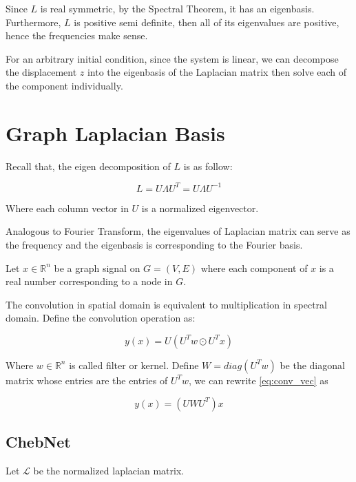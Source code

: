 \documentclass{article}
\begin{document}
    Since $L$ is real symmetric, by the Spectral Theorem, it has an eigenbasis. Furthermore, $L$ is positive semi definite, then all of its eigenvalues are positive, hence the frequencies make sense.

    For an arbitrary initial condition, since the system is linear, we can decompose the displacement $z$ into the eigenbasis of the Laplacian matrix then solve each of the component individually.

    \section{Graph Laplacian Basis}

    Recall that, the eigen decomposition of $L$ is as follow:

    \begin{equation}
        L = U \Lambda U^T = U \Lambda U^{-1}
    \end{equation}

    Where each column vector in $U$ is a normalized eigenvector.

    Analogous to Fourier Transform, the eigenvalues of Laplacian matrix can serve as the frequency and the eigenbasis is corresponding to the Fourier basis.

    Let $x \in \mathbb{R}^n$ be a graph signal on $G = (V, E)$ where each component of $x$ is a real number corresponding to a node in $G$.

    The convolution in spatial domain is equivalent to multiplication in spectral domain. Define the convolution operation as:

    \begin{equation}
        y(x) =  U ( U^T w \odot U^T x )
        \label{eq:conv_vec}
    \end{equation}

    Where $w \in \mathbb{R}^n$ is called filter or kernel. Define $W = diag(U^T w)$ be the diagonal matrix whose entries are the entries of $U^T w$, we can rewrite \ref{eq:conv_vec} as

    \begin{equation}
        y(x) =  (U W U^T) x
    \end{equation}

    \subsection{ChebNet}


    Let $\mathcal{L}$ be the normalized laplacian matrix.
\end{document}
